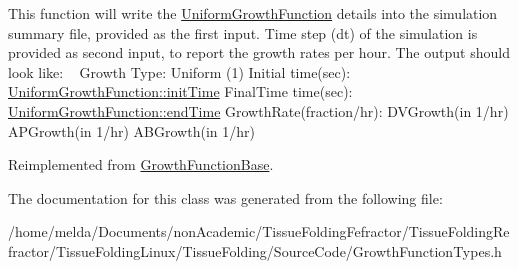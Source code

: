 This function will write the \hyperlink{classUniformGrowthFunction}{Uniform\+Growth\+Function} details into the simulation summary file, provided as the first input. Time step (dt) of the simulation is provided as second input, to report the growth rates per hour. The output should look like\+: ~\newline
 Growth Type\+: Uniform (1) Initial time(sec)\+: \hyperlink{classGrowthFunctionBase_ae92513a7b41637df8e26e7db35ddf97c}{Uniform\+Growth\+Function\+::init\+Time} Final\+Time time(sec)\+: \hyperlink{classGrowthFunctionBase_a3ff4db0573d354a75666a5f3ca446941}{Uniform\+Growth\+Function\+::end\+Time} Growth\+Rate(fraction/hr)\+: D\+V\+Growth(in 1/hr) A\+P\+Growth(in 1/hr) A\+B\+Growth(in 1/hr)

Reimplemented from \hyperlink{classGrowthFunctionBase_ad6403a702f3ed53984083904755a832b}{Growth\+Function\+Base}.



The documentation for this class was generated from the following file\+:\begin{DoxyCompactItemize}
\item 
/home/melda/\+Documents/non\+Academic/\+Tissue\+Folding\+Fefractor/\+Tissue\+Folding\+Refractor/\+Tissue\+Folding\+Linux/\+Tissue\+Folding/\+Source\+Code/Growth\+Function\+Types.\+h\end{DoxyCompactItemize}
